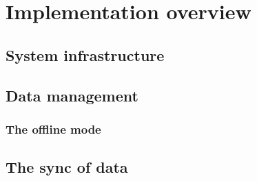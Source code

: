 \section{Implementation overview}
\subsection{System infrastructure}
\subsection{Data management}
\subsubsection{The offline mode}\label{sec:offline}
\subsection{The sync of data} \label{sec:sync}